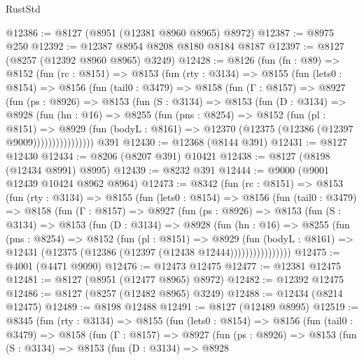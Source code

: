 \begin{lexlean}{RustStd}
\begin{coremodule}
@12386 := @8127 (@8951 (@12381 @8960 @8965) @8972)
@12387 := @8975 @250
@12392 := @12387 @8954 @8208 @8180 @8184 @8187
@12397 := @8127 (@8257 (@12392 @8960 @8965) @3249)
@12428 := @8126
    (fun (fn : @89) =>
    @8152
      (fun (rc : @8151) =>
      @8153
        (fun (rty : @3134) =>
        @8155
          (fun (lets0 : @8154) =>
          @8156
            (fun (tail0 : @3479) =>
            @8158
              (fun (Γ : @8157) =>
              @8927
                (fun (ps : @8926) =>
                @8153
                  (fun (S : @3134) =>
                  @8153
                    (fun (D : @3134) =>
                    @8928
                      (fun (hn : @16) =>
                      @8255
                        (fun (pns : @8254) =>
                        @8152
                          (fun (pl : @8151) =>
                          @8929
                            (fun (bodyL : @8161) =>
                            @12370 (@12375 (@12386 (@12397 @9009))))))))))))))))
    @391
@12430 := @12368 (@8144 @391)
@12431 := @8127 @12430
@12434 := @8206 (@8207 @391) @10421
@12438 := @8127 (@8198 (@12434 @8991) @8995)
@12439 := @8232 @391
@12444 := @9000 (@9001 @12439 @10424 @8962 @8964)
@12473 := @8342
    (fun (rc : @8151) =>
    @8153
      (fun (rty : @3134) =>
      @8155
        (fun (lets0 : @8154) =>
        @8156
          (fun (tail0 : @3479) =>
          @8158
            (fun (Γ : @8157) =>
            @8927
              (fun (ps : @8926) =>
              @8153
                (fun (S : @3134) =>
                @8153
                  (fun (D : @3134) =>
                  @8928
                    (fun (hn : @16) =>
                    @8255
                      (fun (pns : @8254) =>
                      @8152
                        (fun (pl : @8151) =>
                        @8929
                          (fun (bodyL : @8161) =>
                          @12431 (@12375 (@12386 (@12397 (@12438 @12444))))))))))))))))
@12475 := @4001 (@4471 @9090)
@12476 := @12473 @12475
@12477 := @12381 @12475
@12481 := @8127 (@8951 (@12477 @8965) @8972)
@12482 := @12392 @12475
@12486 := @8127 (@8257 (@12482 @8965) @3249)
@12488 := @12434 (@8214 @12475)
@12489 := @8198 @12488
@12491 := @8127 (@12489 @8995)
@12519 := @8345
    (fun (rty : @3134) =>
    @8155
      (fun (lets0 : @8154) =>
      @8156
        (fun (tail0 : @3479) =>
        @8158
          (fun (Γ : @8157) =>
          @8927
            (fun (ps : @8926) =>
            @8153
              (fun (S : @3134) =>
              @8153
                (fun (D : @3134) =>
                @8928

\end{coremodule}
\end{lexlean}
